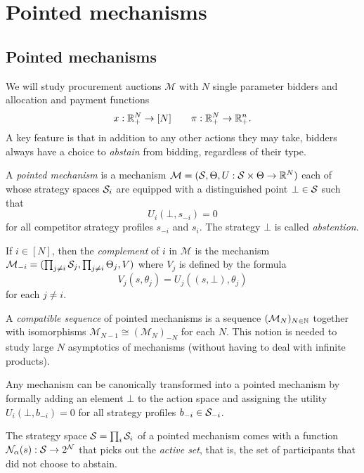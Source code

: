 \newpage
\appendix

\section{Pointed mechanisms}


\subsection{Pointed mechanisms}

We will study procurement auctions $\mathcal{M}$ with $N$ single parameter bidders and allocation and payment functions 
\[
  x: \mathbb{R}_+^N\rightarrow [N] \qquad \pi:\mathbb{R}_+^N\rightarrow \mathbb{R}_+^n.
\]
%
A key feature is that in addition to any other actions they may take, bidders always have a choice to \emph{abstain} from bidding, regardless of their type.

\begin{definition}

  A \emph{pointed mechanism} is a mechanism $\mathcal{M}=(\mathcal{S},\Theta,U:\mathcal{S}\times\Theta\rightarrow\mathbb{R}^N)$ each of whose strategy spaces $\mathcal{S}_i$ are equipped with a distinguished point $\bot\in\mathcal{S}$ such that
  \[
    U_i(\bot,s_{-i})=0 
  \]
  for all competitor strategy profiles $s_{-i}$ and $s_i$.
  The strategy $\bot$ is called \emph{abstention}.

  If $i\in[N]$, then the \emph{complement} of $i$ in $\mathcal{M}$ is the mechanism $\mathcal{M}_{-i}=(\prod_{j\neq i}\mathcal{S}_j,\prod_{j\neq i}\Theta_j,V)$ where $V_j$ is defined by the formula
  \[
    V_j(s,\theta_j) = U_j((s,\bot),\theta_j)
  \]
  for each $j\neq i$.
  
  A \emph{compatible sequence} of pointed mechanisms is a sequence $(\mathcal{M}_N)_{N\in\mathbb{N}}$ together with isomorphisms $\mathcal{M}_{N-1}\cong (\mathcal{M}_N)_{-N}$ for each $N$.
  This notion is needed to study large $N$ asymptotics of mechanisms (without having to deal with infinite products).

\end{definition}

Any mechanism can be canonically transformed into a pointed mechanism by formally adding an element $\bot$ to the action space and assigning the utility $U_i(\bot,b_{-i})=0$ for all strategy profiles $b_{-i}\in\mathcal{S}_{-i}$.

The strategy space $\mathcal{S}=\prod_i\mathcal{S}_i$ of a pointed mechanism comes with a function $\mathcal{N}_\alpha(s):\mathcal{S}\rightarrow 2^{\mathcal{N}}$ that picks out the \emph{active set}, that is, the set of participants that did not choose to abstain.

